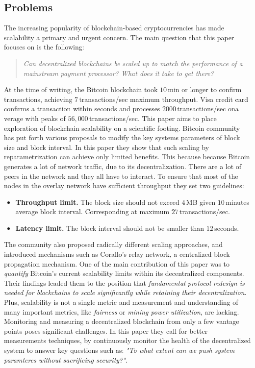 \subsection{Problems}
The increasing popularity of blockchain-based cryptocurrencies
has made scalability a primary and urgent concern. The main question
that this paper focuses on is the following:
\begin{quote}
\emph{Can decentralized blockchains be scaled up to match the performance
of a mainstream payment processor? What does it take
to get there?}
\end{quote}
At the time of writing, the Bitcoin blockchain took $10$\,min or longer
to confirm transactions, achieving $7$\,transactions/sec maximum
throughput. Visa credit card confirms a transaction within seconds
and processes $2000$\,transactions/sec ona verage with peaks
of $56,000$\,transactions/sec. This paper aims to place
exploration of blockchain scalability on a scientific footing.
Bitcoin community has put forth various proposals to modify
the key systems parameters of block size and block interval.
In this paper they show that such scaling by reparametrization
can achieve only limited benefits. This because because Bitcoin
generates a lot of network traffic, due to its
decentralization. There are a lot of peers in the network
and they all have to interact. To ensure that most
of the nodes in the overlay network have sufficient
throughput they set two guidelines:
\begin{itemize}[noitemsep]
	\item \textbf{Throughput limit.} The block size should not exceed $4$\,MB
	given $10$\,minutes average block interval. Corresponding at maximum
	$27$\,transactions/sec.
	\item \textbf{Latency limit.} The block interval should not be smaller
	than $12$\,seconds.
\end{itemize}
The community also proposed radically different scaling approaches,
and introduced mechanisms such as Corallo's relay network,
a centralized block propagation mechanism.
One of the main contribution of this paper was to \emph{quantify}
Bitcoin's current scalability limits within its decentralized components.
Their findings leaded them to the position that \emph{fundamental protocol
redesign is needed for blockchains to scale significantly while retaining their
decentralization}. Plus, scalability is not a single metric and
measurement and understanding of many important metrics,
like \emph{fairness} or \emph{mining power utilization}, are lacking.
Monitoring and measuring a decentralized blockchain from only
a few vantage points poses significant challenges. In this paper
they call for better measurements techniques, by continuously monitor
the health of the decentralized system to answer key questions such as:
\emph{"To what extent can we push system paramteres without sacrificing security?"}.

